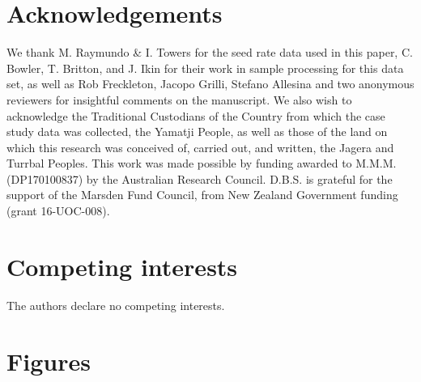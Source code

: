 \documentclass[a4,12pt]{article}
\begin{document}
\begin{refsection}




\section*{Acknowledgements}

We thank M. Raymundo \& I. Towers for the seed rate data used in this paper, C. Bowler, T. Britton, and J. Ikin for their work in sample processing for this data set, as well as Rob Freckleton, Jacopo Grilli, Stefano Allesina and two anonymous reviewers for insightful comments on the manuscript. We also wish to acknowledge the Traditional Custodians of the Country from which the case study data was collected, the Yamatji People, as well as those of the land on which this research was conceived of, carried out, and written, the Jagera and Turrbal Peoples. This work was made possible by funding awarded to M.M.M. (DP170100837) by the Australian Research Council. D.B.S. is grateful for the support of the Marsden Fund Council, from New Zealand Government funding (grant 16-UOC-008).


\section*{Competing interests}

The authors declare no competing interests. 


\newpage

\printbibliography   

\end{refsection}

\newpage 

\section{Figures}
\end{document}
